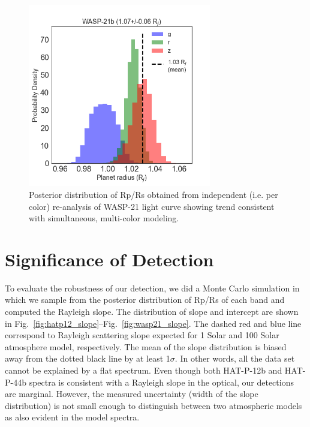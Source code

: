 \begin{figure}
\centering
	\includegraphics[width=8cm]{wasp21/radius_ratios_Rjup_per_band.png}
    \caption{Posterior distribution of Rp/Rs obtained from independent (i.e. per color) re-analysis of WASP-21 light curve showing trend consistent with simultaneous, multi-color modeling.}
    \label{fig:wasp21_combined_grz}
\end{figure}


\section{Significance of Detection}
To evaluate the robustness of our detection, we did a Monte Carlo simulation in which we sample from the posterior distribution of Rp/Rs of each band and computed the Rayleigh slope. The distribution of slope and intercept are shown in Fig.~\ref{fig:hatp12_slope}--Fig.~\ref{fig:wasp21_slope}. The dashed red and blue line correspond to Rayleigh scattering slope expected for 1 Solar and 100 Solar atmosphere model, respectively. The mean of the slope distribution is biased away from the dotted black line by at least 1$\sigma$. In other words, all the data set cannot be explained by a flat spectrum. Even though both HAT-P-12b and HAT-P-44b spectra is consistent with a Rayleigh slope in the optical, our detections are marginal. 
However, the measured uncertainty (width of the slope distribution) is not small enough to distinguish between two atmospheric models as also evident in the model spectra.

